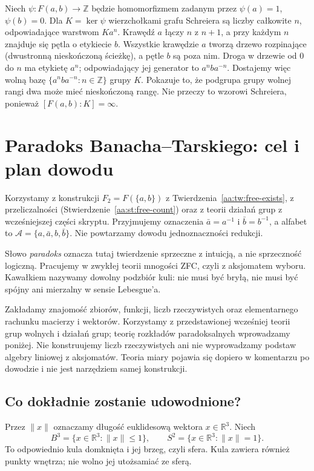 \begin{przyklad}
\label{aa:prz:infinite-rank-subgroup}
Niech $\psi:F(a,b)\to\mathbb Z$ będzie homomorfizmem
zadanym przez $\psi(a)=1$, $\psi(b)=0$.
Dla $K=\ker\psi$ wierzchołkami grafu Schreiera są liczby
całkowite $n$, odpowiadające warstwom $Ka^n$.
Krawędź $a$ łączy $n$ z $n+1$, a przy każdym $n$
znajduje się pętla o etykiecie $b$.
Wszystkie krawędzie $a$ tworzą drzewo rozpinające (dwustronną
nieskończoną ścieżkę), a pętle $b$ są poza nim.
Droga w drzewie od $0$ do $n$ ma etykietę $a^n$;
odpowiadający jej generator to $a^nba^{-n}$.
Dostajemy więc wolną bazę
$\{a^nba^{-n}:n\in\mathbb Z\}$ grupy $K$.
Pokazuje to, że podgrupa grupy wolnej rangi dwa może mieć
nieskończoną rangę. Nie przeczy to wzorowi Schreiera,
ponieważ $[F(a,b):K]=\infty$.
\end{przyklad}

\section{Paradoks Banacha--Tarskiego: cel i plan dowodu}
\label{aa:sec:banach-tarski}

Korzystamy z konstrukcji $F_2=F(\{a,b\})$ z
Twierdzenia~\ref{aa:tw:free-exists}, z przeliczalności
(Stwierdzenie~\ref{aa:st:free-count}) oraz z teorii działań
grup z wcześniejszej części skryptu.
Przyjmujemy oznaczenia $\bar a=a^{-1}$ i $\bar b=b^{-1}$,
a alfabet to $\mathcal A=\{a,\bar a,b,\bar b\}$.
Nie powtarzamy dowodu jednoznaczności redukcji.


Słowo \emph{paradoks} oznacza tutaj twierdzenie sprzeczne z intuicją, a nie sprzeczność logiczną. Pracujemy w zwykłej teorii mnogości ZFC, czyli z aksjomatem wyboru. Kawałkiem nazywamy dowolny podzbiór kuli: nie musi być bryłą, nie musi być spójny ani mierzalny w sensie Lebesgue'a.

Zakładamy znajomość zbiorów, funkcji, liczb rzeczywistych oraz elementarnego rachunku macierzy i wektorów. Korzystamy z przedstawionej wcześniej teorii grup wolnych i działań grup; teorię rozkładów paradoksalnych wprowadzamy poniżej. Nie konstruujemy liczb rzeczywistych ani nie wyprowadzamy podstaw algebry liniowej z aksjomatów. Teoria miary pojawia się dopiero w komentarzu po dowodzie i nie jest narzędziem samej konstrukcji.

\subsection{Co dokładnie zostanie udowodnione?}
Przez $\|x\|$ oznaczamy długość euklidesową wektora $x\in\mathbb R^3$. Niech
\[
 B^3=\{x\in\mathbb R^3:\|x\|\le1\},\qquad S^2=\{x\in\mathbb R^3:\|x\|=1\}.
\]
To odpowiednio kula domknięta i jej brzeg, czyli sfera. Kula zawiera również punkty wnętrza; nie wolno jej utożsamiać ze sferą.

